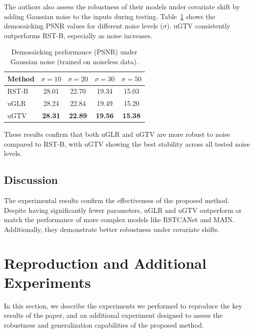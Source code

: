 \documentclass{article}
\theoremstyle{plain}
\theoremstyle{definition}
\theoremstyle{remark}
\begin{document}
The authors also assess the robustness of their models under covariate shift by adding Gaussian noise to the inputs during testing. Table~\ref{tab:robustness} shows the demosaicking PSNR values for different noise levels ($\sigma$). uGTV consistently outperforms RST-B, especially as noise increases.
\begin{table}[ht]
\caption{Demosaicking performance (PSNR) under Gaussian noise (trained on noiseless data).}
\label{tab:robustness}
\vskip -0.2in
\begin{center}
\begin{small}
\begin{sc}
\begin{tabular}{lcccc}
\toprule
\textbf{Method} & $\sigma=10$ & $\sigma=20$ & $\sigma=30$ & $\sigma=50$ \\
\midrule
RST-B & 28.01 & 22.70 & 19.34 & 15.03 \\
uGLR & 28.24 & 22.84 & 19.49 & 15.20 \\
uGTV & \textbf{28.31} & \textbf{22.89} & \textbf{19.56} & \textbf{15.38} \\
\bottomrule
\end{tabular}
\end{sc}
\end{small}
\end{center}
\vskip -0.1in
\end{table}

These results confirm that both uGLR and uGTV are more robust to noise compared to RST-B, with uGTV showing the best stability across all tested noise levels.

\subsection{Discussion}

The experimental results confirm the effectiveness of the proposed method. Despite having significantly fewer parameters, uGLR and uGTV outperform or match the performance of more complex models like RSTCANet and MAIN. Additionally, they demonstrate better robustness under covariate shifts.

\section{Reproduction and Additional Experiments}

In this section, we describe the experiments we performed to reproduce the key results of the paper, and an additional experiment designed to assess the robustness and generalization capabilities of the proposed method.
\end{document}
